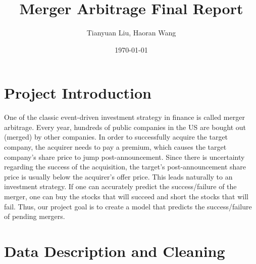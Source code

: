 \documentclass[a4paper]{article}
\title{Merger Arbitrage Final Report}
\author{Tianyuan Liu, Haoran Wang}
\date{\today}
\begin{document}
\maketitle

\section{Project Introduction}
\label{sec:idea}

One of the classic event-driven investment strategy in finance is called merger arbitrage. Every year, hundreds of public companies in the US are bought out (merged) by other companies. In order to successfully acquire the target company, the acquirer needs to pay a premium, which causes the target company’s share price to jump post-announcement. Since there is uncertainty regarding the success of the acquisition, the target’s post-announcement share price is usually below the acquirer’s offer price. This leads naturally to an investment strategy. If one can accurately predict the success/failure of the merger, one can buy the stocks that will succeed and short the stocks that will fail. Thus, our project goal is to create a model that predicts the success/failure of pending mergers.

\section{Data Description and Cleaning }
\label{sec:data}
\end{document}
